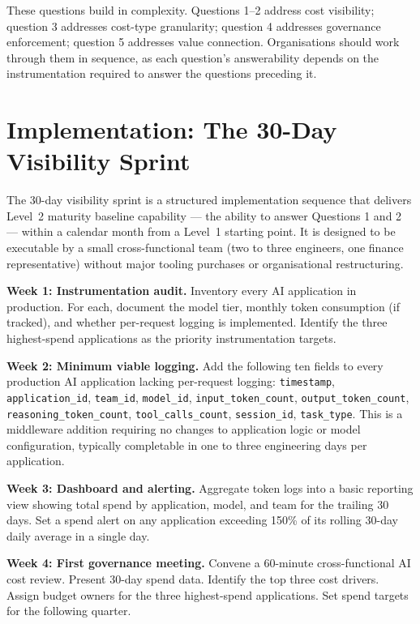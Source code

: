 \documentclass[11pt,twocolumn]{article}
\begin{document}
These questions build in complexity. Questions 1--2 address cost visibility;
question 3 addresses cost-type granularity; question 4 addresses governance
enforcement; question 5 addresses value connection. Organisations should work
through them in sequence, as each question's answerability depends on the
instrumentation required to answer the questions preceding it.

\section{Implementation: The 30-Day Visibility Sprint}
\label{sec:implementation}

The 30-day visibility sprint is a structured implementation sequence that delivers
Level~2 maturity baseline capability --- the ability to answer Questions 1 and 2 ---
within a calendar month from a Level~1 starting point. It is designed to be
executable by a small cross-functional team (two to three engineers, one finance
representative) without major tooling purchases or organisational restructuring.

\textbf{Week 1: Instrumentation audit.} Inventory every AI application in production.
For each, document the model tier, monthly token consumption (if tracked), and
whether per-request logging is implemented. Identify the three highest-spend
applications as the priority instrumentation targets.

\textbf{Week 2: Minimum viable logging.} Add the following ten fields to every
production AI application lacking per-request logging: \texttt{timestamp},
\texttt{application\_id}, \texttt{team\_id}, \texttt{model\_id},
\texttt{input\_token\_count}, \texttt{output\_token\_count},
\texttt{reasoning\_token\_count}, \texttt{tool\_calls\_count}, \texttt{session\_id},
\texttt{task\_type}. This is a middleware addition requiring no changes to
application logic or model configuration, typically completable in one to three
engineering days per application.

\textbf{Week 3: Dashboard and alerting.} Aggregate token logs into a basic
reporting view showing total spend by application, model, and team for the
trailing 30 days. Set a spend alert on any application exceeding 150\% of
its rolling 30-day daily average in a single day.

\textbf{Week 4: First governance meeting.} Convene a 60-minute cross-functional
AI cost review. Present 30-day spend data. Identify the top three cost drivers.
Assign budget owners for the three highest-spend applications. Set spend targets
for the following quarter.
\end{document}
